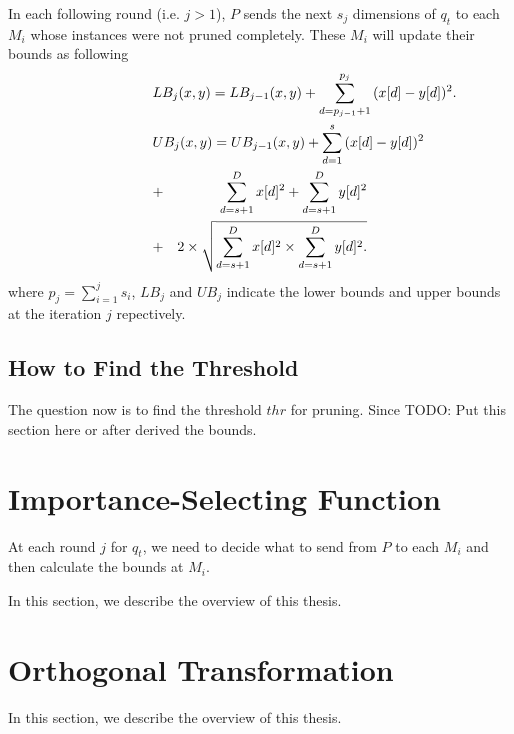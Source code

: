 In each following round (i.e. $j>1$), $P$ sends the next $s_j$ dimensions of $q_t$ to each $M_i$ whose instances were not pruned completely.  These $M_i$ will update their bounds as following
{
\begin{eqnarray}
\lefteqn{LB_j(x,y) = LB_{j-1}(x,y)+\sum^{p_j}_{d=p_{j-1}+1}{(x[d]-y[d])^2}.} \label{eq:single-LB} \\
\lefteqn{UB_j(x,y) = UB_{j-1}(x,y)+\sum^s_{d=1}{(x[d]-y[d])^2}} \notag \\
& + & \sum^D_{d=s+1}{x[d]^2}+\sum^D_{d=s+1}{y[d]^2} \notag \\
& + & 2 \times \sqrt{\sum^D_{d=s+1}{x[d]^2}\times \sum^D_{d=s+1}{y[d]^2}.}\label{eq:single-UB}
\end{eqnarray}
}
where $p_j=\sum^j_{i=1}{s_i}$, $LB_j$ and $UB_j$ indicate the lower bounds and upper bounds at the iteration $j$ repectively.


\subsection{How to Find the Threshold} %
\label{ss:find_the_threshold}
The question now is to find the threshold $thr$ for pruning.  Since 
TODO: Put this section here or after derived the bounds.



\section{Importance-Selecting Function} %
\label{s:importance_selecting_function}
At each round $j$ for $q_t$, we need to decide what to send from $P$ to each $M_i$ and then calculate the bounds at $M_i$. 

In this section, we describe the overview of this thesis.


\section{Orthogonal Transformation}
\label{s:orthogonal}
In this section, we describe the overview of this thesis.

